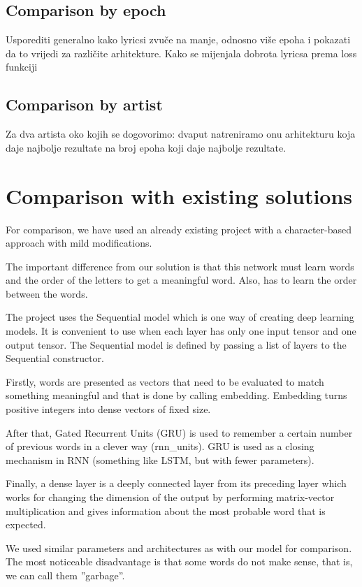 \documentclass[conference]{IEEEtran}
\begin{document}
\subsection{Comparison by epoch}
Usporediti generalno kako lyricsi zvuče na manje, odnosno više epoha i pokazati
da to vrijedi za različite arhitekture.
Kako se mijenjala dobrota lyricsa prema loss funkciji
\subsection{Comparison by artist}
Za dva artista oko kojih se dogovorimo: dvaput natreniramo onu arhitekturu koja
daje najbolje rezultate na broj epoha koji daje najbolje rezultate.

\section{Comparison with existing solutions}
For comparison, we have used an already existing project with a character-based approach with mild modifications.

The important difference from our solution is that this network must learn words and the order of the letters to get a meaningful word.
Also, has to learn the order between the words.

The project uses the Sequential model which is one way of creating deep learning models. 
It is convenient to use when each layer has only one input tensor and one output
tensor. The Sequential model is defined by passing a list of layers to the Sequential
constructor.

Firstly, words are presented as vectors that need to be evaluated to match
something meaningful and that is done by calling embedding. Embedding turns positive integers
into dense vectors of fixed size. 

After that, Gated Recurrent Units (GRU) is used to remember
a certain number of previous words in a clever way (rnn\_units). GRU is used as a closing mechanism in 
RNN (something like LSTM, but with fewer parameters). 

Finally, a dense layer is a deeply connected layer
from its preceding layer which works for changing the dimension of the output by
performing matrix-vector multiplication and gives information about the most probable word that
is expected.

We used similar parameters and architectures as with our model for comparison. 
The most noticeable disadvantage is that some words do not make sense, that is, we can call them ''garbage''.
\end{document}
